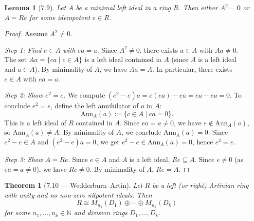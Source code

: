 \documentclass[12pt]{article}
\newtheorem{theorem}{Theorem}
\newtheorem{lemma}{Lemma}
\begin{document}
\begin{lemma}[7.9]
Let $A$ be a minimal left ideal in a ring $R$. Then either $A^2 = 0$ or $A = Re$ for some idempotent $e \in R$.
\end{lemma}

\begin{proof}
Assume $A^2 \neq 0$.

\textit{Step 1: Find $e \in A$ with $ea = a$.}
Since $A^2 \neq 0$, there exists $a \in A$ with $Aa \neq 0$. The set $Aa = \{ca \mid c \in A\}$ is a left ideal contained in $A$ (since $A$ is a left ideal and $a \in A$). By minimality of $A$, we have $Aa = A$. In particular, there exists $e \in A$ with $ea = a$.

\textit{Step 2: Show $e^2 = e$.}
We compute $(e^2 - e)a = e(ea) - ea = ea - ea = 0$. To conclude $e^2 = e$, define the left annihilator of $a$ in $A$:
\[
  \mathrm{Ann}_A(a) := \{c \in A \mid ca = 0\}.
\]
This is a left ideal of $R$ contained in $A$. Since $ea = a \neq 0$, we have $e \notin \mathrm{Ann}_A(a)$, so $\mathrm{Ann}_A(a) \neq A$. By minimality of $A$, we conclude $\mathrm{Ann}_A(a) = 0$. Since $e^2 - e \in A$ and $(e^2 - e)a = 0$, we get $e^2 - e \in \mathrm{Ann}_A(a) = 0$, hence $e^2 = e$.

\textit{Step 3: Show $A = Re$.}
Since $e \in A$ and $A$ is a left ideal, $Re \subseteq A$. Since $e \neq 0$ (as $ea = a \neq 0$), we have $Re \neq 0$. By minimality of $A$, $Re = A$.
\end{proof}

\begin{theorem}[7.10 — Wedderburn--Artin]
Let $R$ be a left (or right) Artinian ring with unity and no non-zero nilpotent ideals. Then
\[
  R \cong M_{n_1}(D_1) \oplus \cdots \oplus M_{n_k}(D_k)
\]
for some $n_1, \ldots, n_k \in \mathbb{N}$ and division rings $D_1, \ldots, D_k$.
\end{theorem}
\end{document}
